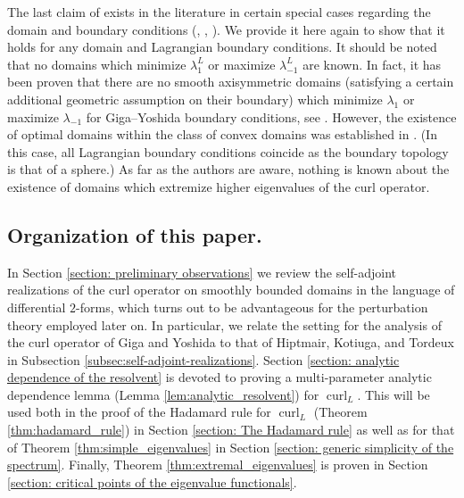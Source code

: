 \documentclass[11pt,reqno]{amsart}
\DeclareMathOperator{\curl}{curl}
\begin{document}
The last claim of  exists in the literature in certain special cases regarding the domain and boundary conditions (\cite{CantarellaDeTurckGluckTeytelA}, \cite{EncisoPeralta2020}, \cite{Gerner2023}). We provide it here again to show that it holds for any domain and Lagrangian boundary conditions. It should be noted that no domains which minimize $\lambda^L_1$ or maximize $\lambda^L_{-1}$ are known. In fact, it has been proven that there are no smooth axisymmetric domains (satisfying a certain additional geometric assumption on their boundary) which minimize $\lambda_1$ or maximize $\lambda_{-1}$ for Giga--Yoshida boundary conditions, see \cite{EncisoPeralta2020}. However, the existence of optimal domains within the class of convex domains was established in \cite{EncisoGernerPeralta2024}. (In this case, all Lagrangian boundary conditions coincide as the boundary topology is that of a sphere.) As far as the authors are aware, nothing is known about the existence of domains which extremize higher eigenvalues of the curl operator.

\subsection{Organization of this paper.} In Section \ref{section: preliminary observations} we review the self-adjoint realizations of the curl operator on smoothly bounded domains in the language of differential $2$-forms, which turns out to be advantageous for the perturbation theory employed later on. In particular, we relate the setting for the analysis of the curl operator of Giga and Yoshida \cite{GigaYoshida1990} to that of Hiptmair, Kotiuga, and Tordeux \cite{HiptmairKotiugaTordeux2012} in Subsection \ref{subsec:self-adjoint-realizations}. Section \ref{section: analytic dependence of the resolvent} is devoted to proving a multi-parameter analytic dependence lemma (Lemma \ref{lem:analytic_resolvent}) for $\curl_L$. This will be used both in the proof of the Hadamard rule for $\curl_L$ (Theorem \ref{thm:hadamard_rule}) in Section \ref{section: The Hadamard rule} as well as for that of Theorem \ref{thm:simple_eigenvalues} in Section \ref{section: generic simplicity of the spectrum}. Finally, Theorem \ref{thm:extremal_eigenvalues} is proven in Section \ref{section: critical points of the eigenvalue functionals}.
\end{document}
